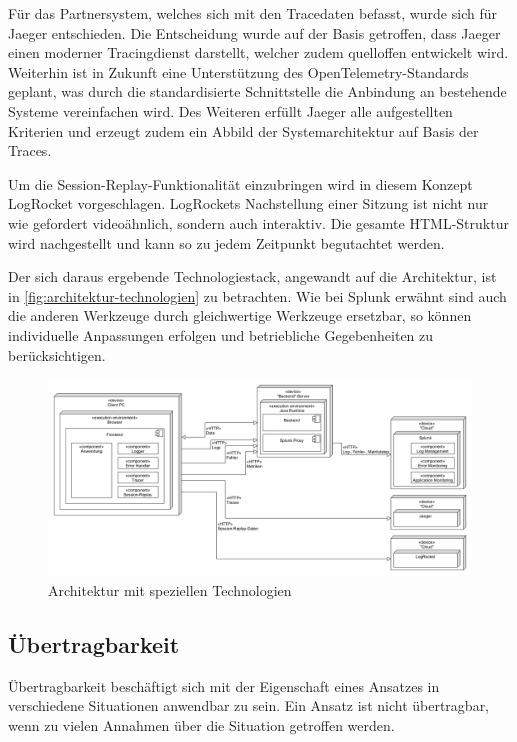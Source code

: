 	Für das Partnersystem, welches sich mit den Tracedaten befasst, wurde sich für Jaeger entschieden. Die Entscheidung wurde auf der Basis getroffen, dass Jaeger einen moderner Tracingdienst darstellt, welcher zudem quelloffen entwickelt wird. Weiterhin ist in Zukunft eine Unterstützung des OpenTelemetry-Standards geplant, was durch die standardisierte Schnittstelle die Anbindung an bestehende Systeme vereinfachen wird. Des Weiteren erfüllt Jaeger alle aufgestellten Kriterien und erzeugt zudem ein Abbild der Systemarchitektur auf Basis der Traces.
	
	Um die Session-Replay-Funktionalität einzubringen wird in diesem Konzept LogRocket vorgeschlagen. LogRockets Nachstellung einer Sitzung ist nicht nur wie gefordert videoähnlich, sondern auch interaktiv. Die gesamte HTML-Struktur wird nachgestellt und kann so zu jedem Zeitpunkt begutachtet werden.
	
	Der sich daraus ergebende Technologiestack, angewandt auf die Architektur, ist in \autoref{fig:architektur-technologien} zu betrachten. Wie bei Splunk erwähnt sind auch die anderen Werkzeuge durch gleichwertige Werkzeuge ersetzbar, so können individuelle Anpassungen erfolgen und betriebliche Gegebenheiten zu berücksichtigen.
	
\begin{figure}[H]
	\centering
	\includegraphics[width=0.75\linewidth]{img/04_erstellung-poc/konzept-technologien.png}
	\caption{Architektur mit speziellen Technologien}
	\label{fig:architektur-technologien}
\end{figure}

	\subsection{Übertragbarkeit}
	
	Übertragbarkeit beschäftigt sich mit der Eigenschaft eines Ansatzes in verschiedene Situationen anwendbar zu sein. Ein Ansatz ist nicht übertragbar, wenn zu vielen Annahmen über die Situation getroffen werden.
	

